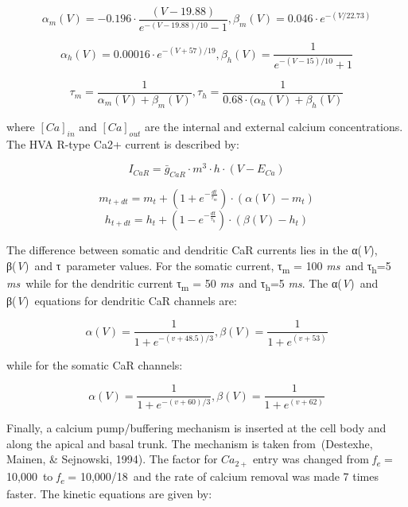 \documentclass[a4paper]{article}
\begin{document}
\begin{equation}
α_m(V)=-0.196\cdot \frac{(V-19.88)}{e^{-(V-19.88)/10}-1},β_m(V)=0.046\cdot e^{-(V/22.73)}
\end{equation}

\begin{equation}
α_h(V)=0.00016\cdot e^{-(V+57)/19},β_h(V)=\frac 1{e^{-(V-15)/10}+1}
\end{equation}

\begin{equation}
τ_m=\frac {1}{α_m(V)+β_m(V)},τ_h=\frac {1}{0.68\cdot (α_h(V)+β_h(V)}
\end{equation}

where
$[Ca]_{in}$ and $[Ca]_{out}$ are the
internal and external calcium concentrations. The HVA R-type Ca2+ current is described by:


\begin{equation}
I_{CaR}=\bar g_{CaR}\cdot m^3\cdot h\cdot
(V-E_{Ca})
\end{equation}

\begin{equation}
m_{t+dt}=m_t+(1+e^{-\frac{dt}{τ_m}})\cdot (α(V)-m_t)
\end{equation}
\begin{equation}
h_{t+dt}=h_t+(1-e^{-\frac{dt}{τ_h}})\cdot (β(V)-h_t)
\end{equation}

The difference between somatic and dendritic CaR currents lies in the α(\textit{V}), β(\textit{V})~and τ~parameter
values. For the somatic current, τ\textsubscript{m}\textit{ }=\textit{ }100\textit{ ms}~and
τ\textsubscript{h}=5\textit{ ms}~while for the dendritic current τ\textsubscript{m}\textit{ }=\textit{ }50\textit{
ms}~and τ\textsubscript{h}=5\textit{ ms}. The α(\textit{V})~and β(\textit{V})~equations for dendritic CaR channels are:


\begin{equation}
α(V)=\frac 1{1+e^{-(v+48.5)/3}},β(V)=\frac 1{1+e^{(v+53)}}
\end{equation}

while for the somatic CaR channels:


\begin{equation}
α(V)=\frac 1{1+e^{-(v+60)/3}},β(V)=\frac 1{1+e^{(v+62)}}
\end{equation}

Finally, a calcium pump/buffering mechanism is inserted at the cell body and along the apical and basal trunk. The
mechanism is taken from~(Destexhe, Mainen, \& Sejnowski, 1994). The factor for
$Ca_{2+}$ entry was changed from
\textit{f}\textit{\textsubscript{e}}\textit{ }=\textit{ }10,000~to \textit{f}\textit{\textsubscript{e}}\textit{
}=\textit{ }10,000/18~and the rate of calcium removal was made 7 times faster. The kinetic equations are given by:
\end{document}
